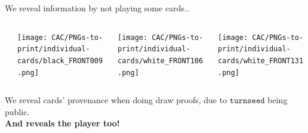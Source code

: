 \documentclass[fleqn,xcolor={usenames,dvipsnames},notes,aspectratio=169]{beamer} %
\newcommand{\var}[1]{\ensuremath{\mathtt{#1}}}
\newcommand{\turnseed}{\var{turnseed}}
\begin{document}
\begin{frame}

We reveal information by not playing some cards..

\bigskip\medskip

\begin{columns}
\begin{column}[t]{0.1\textwidth}
\end{column}
\begin{column}[t]{0.3\textwidth}
\texttt{[image: CAC/PNGs-to-print/individual-cards/black\_FRONT009.png]}
\end{column}
\begin{column}[t]{0.3\textwidth}
\texttt{[image: CAC/PNGs-to-print/individual-cards/white\_FRONT106.png]}
\end{column}
\begin{column}[t]{0.3\textwidth}
\texttt{[image: CAC/PNGs-to-print/individual-cards/white\_FRONT131.png]}
\end{column}
\end{columns}   

\bigskip\medskip

We reveal cards' provenance when doing draw proofs, due to $\turnseed$ being public. \\ \smallskip
\pause
\hspace*{100pt} {\bf And reveals the player too!}

\end{frame}
\end{document}
